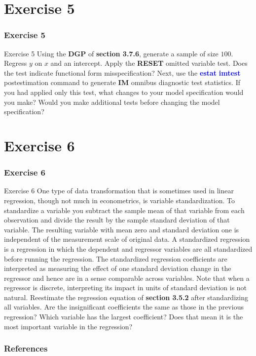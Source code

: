 \documentclass[11pt, aspectratio=169]{beamer}
\begin{document}
	\section{Exercise 5}
		\begin{frame}
			\frametitle{Exercise 5}
			\begin{block}{Exercise 5}
				Using the \textbf{DGP} of \textcolor{red!50}{\textbf{section 3.7.6}}, generate a sample of size $100$. Regress 
				$y$ on $x$ and an intercept. Apply the \textbf{RESET} omitted variable test. Does
				the test indicate functional form misspecification? Next, use the \textcolor{blue}{\textbf{estat}}
				\textcolor{blue}{\textbf{imtest}} postestimation command to generate \textbf{IM} omnibus diagnostic
				test statistics. If you had applied only this test, what changes to your
				model specification would you make? Would you make additional
				tests before changing the model specification?
			\end{block}
		\end{frame}
	\section{Exercise 6}
		\begin{frame}
			\frametitle{Exercise 6}
			\begin{block}{Exercise 6}
				One type of data transformation that is sometimes used in linear
				regression, though not much in econometrics, is variable
				standardization. To standardize a variable you subtract the sample
				mean of that variable from each observation and divide the result by
				the sample standard deviation of that variable. The resulting variable
				with mean zero and standard deviation one is independent of the
				measurement scale of original data. A standardized regression is a
				regression in which the dependent and regressor variables are all
				standardized before running the regression. The standardized
				regression coefficients are interpreted as measuring the effect of one
				standard deviation change in the regressor and hence are in a sense
				comparable across variables. Note that when a regressor is discrete,
				interpreting its impact in units of standard deviation is not natural.
				Reestimate the regression equation of \textcolor{red!50}{\textbf{section 3.5.2}} after standardizing
				all variables. Are the insignificant coefficients the same as those in the
				previous regression? Which variable has the largest coefficient? Does
				that mean it is the most important variable in the regression?
			\end{block}
		\end{frame}
	\begin{frame}[t,allowframebreaks]
		\frametitle{References}
		
		
		\nocite{cameron2022-I}
		\nocite{cameron2022-II}
	\end{frame}
	\begin{frame}
		\maketitle
	\end{frame}
\end{document}
